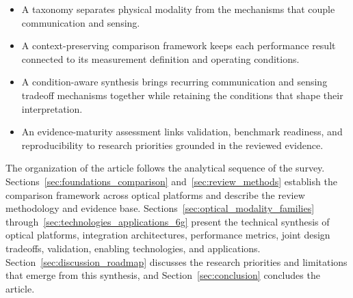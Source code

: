 \begin{itemize}
\item A taxonomy separates physical modality from the mechanisms that couple
communication and sensing.

\item A context-preserving comparison framework keeps each performance result
connected to its measurement definition and operating conditions.

\item A condition-aware synthesis brings recurring communication and sensing
tradeoff mechanisms together while retaining the conditions that shape their
interpretation.

\item An evidence-maturity assessment links validation, benchmark readiness,
and reproducibility to research priorities grounded in the reviewed evidence.
\end{itemize}

The organization of the article follows the analytical sequence of the survey.
Sections~\ref{sec:foundations_comparison} and~\ref{sec:review_methods}
establish the comparison framework across optical platforms and describe the
review methodology and evidence base. Sections~\ref{sec:optical_modality_families}
through~\ref{sec:technologies_applications_6g} present the technical synthesis
of optical platforms, integration architectures, performance metrics, joint
design tradeoffs, validation, enabling technologies, and applications.
Section~\ref{sec:discussion_roadmap} discusses the research priorities and
limitations that emerge from this synthesis, and
Section~\ref{sec:conclusion} concludes the article.
